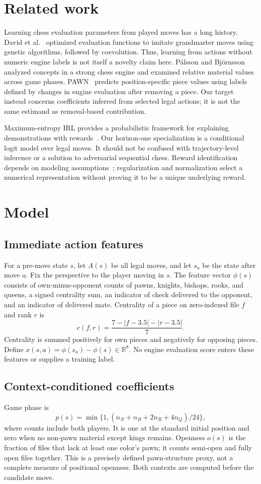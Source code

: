 \documentclass[11pt]{article}
\begin{document}
\section{Related work}
Learning chess evaluation parameters from played moves has a long history. David et al.\ \cite{david} optimized evaluation functions to imitate grandmaster moves using genetic algorithms, followed by coevolution. Thus, learning from actions without numeric engine labels is not itself a novelty claim here. P\'alsson and Bj\"ornsson\ \cite{palsson} analyzed concepts in a strong chess engine and examined relative material values across game phases. PAWN\ \cite{pawn} predicts position-specific piece values using labels defined by changes in engine evaluation after removing a piece. Our target instead concerns coefficients inferred from selected legal actions; it is not the same estimand as removal-based contribution.

Maximum-entropy IRL provides a probabilistic framework for explaining demonstrations with rewards\ \cite{ziebart}. Our horizon-one specialization is a conditional logit model over legal moves. It should not be confused with trajectory-level inference or a solution to adversarial sequential chess. Reward identification depends on modeling assumptions\ \cite{kim}; regularization and normalization select a numerical representation without proving it to be a unique underlying reward.

\section{Model}
\subsection{Immediate action features}
For a pre-move state $s$, let $A(s)$ be all legal moves, and let $s_a$ be the state after move $a$. Fix the perspective to the player moving in $s$. The feature vector $\phi(s)$ consists of own-minus-opponent counts of pawns, knights, bishops, rooks, and queens, a signed centrality sum, an indicator of check delivered to the opponent, and an indicator of delivered mate. Centrality of a piece on zero-indexed file $f$ and rank $r$ is
\[
c(f,r)=\frac{7-|f-3.5|-|r-3.5|}{7}.
\]
Centrality is summed positively for own pieces and negatively for opposing pieces. Define $x(s,a)=\phi(s_a)-\phi(s)\in\mathbb R^8$. No engine evaluation score enters these features or supplies a training label.

\subsection{Context-conditioned coefficients}
Game phase is
\[
p(s)=\min\{1,(n_N+n_B+2n_R+4n_Q)/24\},
\]
where counts include both players. It is one at the standard initial position and zero when no non-pawn material except kings remains. Openness $o(s)$ is the fraction of files that lack at least one color's pawn; it counts semi-open and fully open files together. This is a precisely defined pawn-structure proxy, not a complete measure of positional openness. Both contexts are computed before the candidate move.
\end{document}
